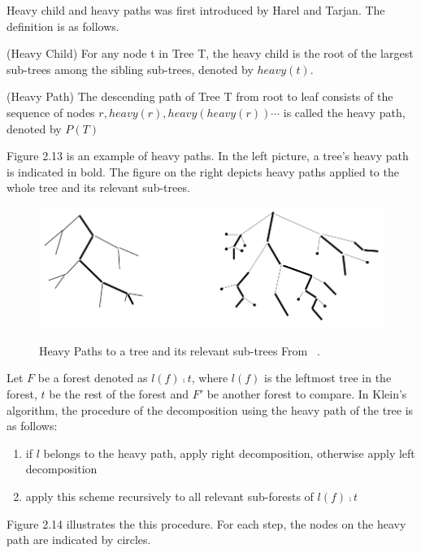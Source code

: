 Heavy child and heavy paths was first introduced by Harel and Tarjan\cite{harel1984fast}. The definition is as follows.

\begin{definition}
(Heavy Child)
For any node t in Tree T, the heavy child is the root of the largest sub-trees among the sibling sub-trees, denoted by $heavy(t)$.
\end{definition}

\begin{definition}
(Heavy Path)
The descending path of Tree T from root to leaf consists of the sequence of nodes $r, heavy(r), heavy(heavy(r)) \cdots$ is called the heavy path, denoted by $P(T)$
\end{definition}

Figure 2.13 is an example of heavy paths. In the left picture, a tree's heavy path is indicated in bold. The figure on the right depicts heavy paths applied to the whole tree and its relevant sub-trees.

\begin{figure}
		\centering
		\includegraphics[width=12cm,clip]{Figures/HeavyPaths}
		\label{Heavy Paths} 
		\caption{Heavy Paths to a tree and its relevant sub-trees From ~\cite{klein1998computing}.}
\end{figure}

Let $F$ be a forest denoted as $l(f) \comp t$, where $l(f)$ is the leftmost tree in the forest, $t$ be the rest of the forest and $F'$ be another forest to compare. In Klein's algorithm, the procedure of the decomposition using the heavy path of the tree is as follows:

\begin{enumerate}
\item if $l$ belongs to the heavy path, apply right decomposition, otherwise apply left decomposition
\item apply this scheme recursively to all relevant sub-forests of $l(f) \comp t$
\end{enumerate}

Figure 2.14 illustrates the this procedure. For each step, the nodes on the heavy path are indicated by circles. 

